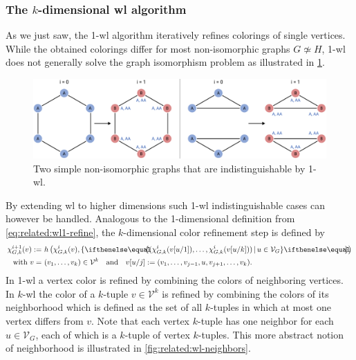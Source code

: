 \subsubsection{The $k$-dimensional \acs{wl} algorithm}
As we just saw, the 1-\acs{wl} algorithm iteratively refines colorings of single vertices.
While the obtained colorings differ for most non-isomorphic graphs $G \not\simeq H$, 1-\acs{wl} does not generally solve the graph isomorphism problem as illustrated in \cref{fig:related:wl1-problem}.
\begin{figure}[ht]
	\centering
	\includegraphics[width=\linewidth]{gfx/related-work/wl1-problem.pdf}
	\caption[Two simple non-isomorphic graphs that are indistinguishable by 1-\acs{wl}.]{
		Two simple non-isomorphic graphs that are indistinguishable by 1-\acs{wl}.
	}\label{fig:related:wl1-problem}
\end{figure}
By extending \ac{wl} to higher dimensions such 1-\acs{wl} indistinguishable cases can however be handled.
Analogous to the 1-dimensional definition from \cref{eq:related:wl1-refine}, the $k$-dimensional color refinement step is defined by
\begin{align}
	\chi_{G,k}^{i+1}(v) := &\ h\left(\chi_{G,k}^{i}(v), \ldblbrace (\chi_{G,k}^{i}(v[u/1]), \dots, \chi_{G,k}^{i}(v[u/k]))\, |\, u \in \mathcal{V}_G \rdblbrace\right)\label{eq:related:wlk-refine}\\
	\text{with } v = &\ (v_1, \dots, v_k) \in \mathcal{V}^k \quad\text{and}\quad v[u/j] := (v_1, \dots, v_{j-1}, u, v_{j+1}, \dots, v_k)\text{.} \nonumber
\end{align}
In 1-\acs{wl} a vertex color is refined by combining the colors of neighboring vertices.
In $k$-\acs{wl} the color of a $k$-tuple $v \in \mathcal{V}^k$ is refined by combining the colors of its neighborhood which is defined as the set of all $k$-tuples in which at most one vertex differs from $v$.
Note that each vertex $k$-tuple has one neighbor for each $u \in \mathcal{V}_G$, each of which is a $k$-tuple of vertex $k$-tuples.
This more abstract notion of neighborhood is illustrated in \cref{fig:related:wl-neighbors}.
